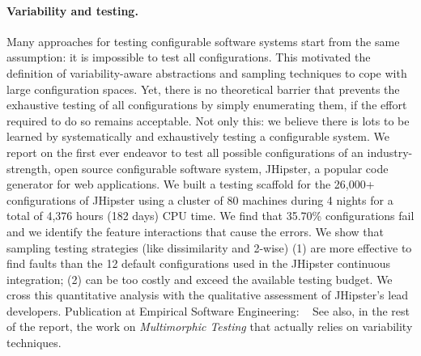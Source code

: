 


    
    
    



\paragraph{Variability and testing.}
Many approaches for testing configurable software systems start from the same assumption: it is impossible to test all configurations. This motivated the definition of variability-aware abstractions and sampling techniques to cope with large configuration spaces. Yet, there is no theoretical barrier that prevents the exhaustive testing of all configurations by simply enumerating them, if the effort required to do so remains acceptable. Not only this: we believe there is lots to be learned by systematically and exhaustively testing a configurable system. We report on the first ever endeavor to test all possible configurations of an industry-strength, open source configurable software system, JHipster, a popular code generator for web applications. We built a testing scaffold for the 26,000+ configurations of JHipster using a cluster of 80 machines during 4 nights for a total of 4,376 hours (182 days) CPU time. We find that 35.70\% configurations fail and we identify the feature interactions that cause the errors. We show that sampling testing strategies (like dissimilarity and 2-wise) (1) are more effective to find faults than the 12 default configurations used in the JHipster continuous integration; (2) can be too costly and exceed the available testing budget. We cross this quantitative analysis with the qualitative assessment of JHipster's lead developers.
Publication at Empirical Software Engineering: ~\cite{halin:hal-01829928}
See also, in the rest of the report, the work on \emph{Multimorphic Testing} that actually relies on variability techniques. 


